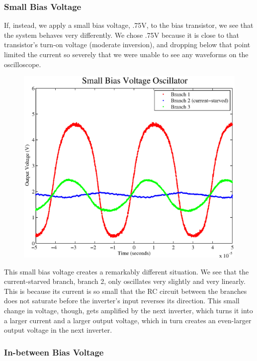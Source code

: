 \documentclass{article}
\begin{document}
\subsubsection*{Small Bias Voltage}

If, instead, we apply a small bias voltage, .75V, to the bias transistor, we see that the system behaves very differently.  We chose .75V because it is close to that transistor's turn-on voltage (moderate inversion), and dropping below that point limited the current so severely that we were unable to see any waveforms on the oscilloscope.

\begin{figure}[H]
\centering
\includegraphics[scale=.6]{small_bias.eps}
\caption{}
\label{smallBias}
\end{figure}

This small bias voltage creates a remarkably different situation.  We see that the current-starved branch, branch 2, only oscillates very slightly and very linearly.  This is because its current is so small that the RC circuit between the branches does not saturate before the inverter's input reverses its direction.  This small change in voltage, though, gets amplified by the next inverter, which turns it into a larger current and a larger output voltage, which in turn creates an even-larger output voltage in the next inverter.

\subsubsection*{In-between Bias Voltage}
\end{document}
